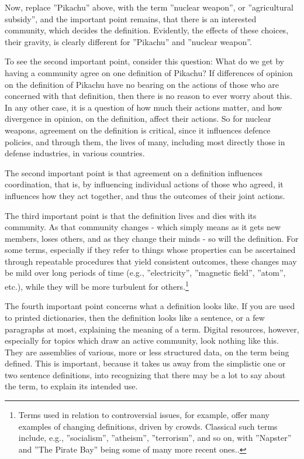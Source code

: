 \documentclass[graybox,envcountchap,sectrefs]{svmono}
\begin{document}
Now, replace ''Pikachu'' above, with the term ''nuclear weapon'', or ''agricultural subsidy'', and the important point remains, that there is an interested community, which decides the definition. Evidently, the effects of these choices, their gravity, is clearly different for ''Pikachu'' and ''nuclear weapon''.

To see the second important point, consider this question: What do we get by having a community agree on one definition of Pikachu? If differences of opinion on the definition of Pikachu have no bearing on the actions of those who are concerned with that definition, then there is no reason to ever worry about this. In any other case, it is a question of how much their actions matter, and how divergence in opinion, on the definition, affect their actions. So for nuclear weapons, agreement on the definition is critical, since it influences defence policies, and through them, the lives of many, including most directly those in defense industries, in various countries.

The second important point is that agreement on a definition influences coordination, that is, by influencing individual actions of those who agreed, it influences how they act together, and thus the outcomes of their joint actions.

The third important point is that the definition lives and dies with its community. As that community changes - which simply means as it gets new members, loses others, and as they change their minds - so will the definition. For some terms, especially if they refer to things whose properties can be ascertained through repeatable procedures that yield consistent outcomes, these changes may be mild over long periods of time (e.g., ''electricity'', ''magnetic field'', ''atom'', etc.), while they will be more turbulent for others.\footnote{Terms used in relation to controversial issues, for example, offer many examples of changing definitions, driven by crowds. Classical such terms include, e.g., ''socialism'', ''atheism'', ''terrorism'', and so on, with ''Napster'' and ''The Pirate Bay'' being some of many more recent ones.\cite{wikipedia-controversial-issues,yasseri2014most}.}

The fourth important point concerns what a definition looks like. If you are used to printed dictionaries, then the definition looks like a sentence, or a few paragraphs at most, explaining the meaning of a term. Digital resources, however, especially for topics which draw an active community, look nothing like this. They are assemblies of various, more or less structured data, on the term being defined. This is important, because it takes us away from the simplistic one or two sentence definitions, into recognizing that there may be a lot to say about the term, to explain its intended use.
\end{document}
